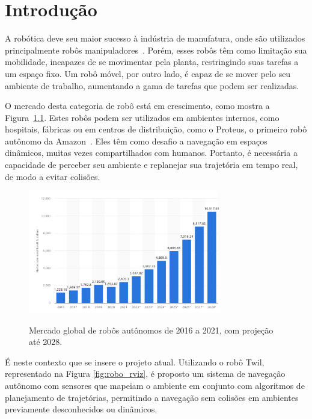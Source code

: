 \documentclass[repeatfields,xlists,xpacks,oneside,yearsonly]{ufrgscca}
\begin{document}
\tableofcontents

\chapter{Introdução}

A robótica deve seu maior sucesso à indústria de manufatura, onde são
utilizados principalmente robôs
manipuladores~\cite{IntroductionToMobileRobots}. Porém, esses robôs
têm como limitação sua mobilidade, incapazes de se movimentar pela
planta, restringindo suas tarefas a um espaço fixo. Um robô móvel,
por outro lado, é capaz de se mover pelo seu ambiente de trabalho,
aumentando a gama de tarefas que podem ser realizadas.

O mercado desta categoria de robô está em crescimento, como mostra a
Figura~\ref{fig:mercado_robo}. Estes robôs podem ser utilizados em
ambientes internos, como hospitais, fábricas ou em centros de
distribuição, como o Proteus, o primeiro robô autônomo da
Amazon~\cite{amazon_robot}. Eles têm como desafio a navegação em
espaços dinâmicos, muitas vezes compartilhados com humanos. Portanto,
é necessária a capacidade de perceber seu ambiente e replanejar sua
trajetória em tempo real, de modo a evitar colisões.


\begin{figure}[htbp]
    {
        \centering
        \caption{Mercado global de robôs autônomos de 2016 a 2021, com projeção até 2028.}
        \label{fig:mercado_robo}
        \includegraphics[width=0.75\textwidth]{mercado_robo}\\
    }
    {}
\end{figure}

É neste contexto que se insere o projeto atual.
Utilizando o robô Twil, representado na Figura \ref{fig:robo_rviz},
é proposto um sistema de navegação autônomo com sensores
que mapeiam o ambiente em conjunto com algoritmos de planejamento
de trajetórias, permitindo a navegação sem colisões em ambientes previamente
desconhecidos ou dinâmicos.
\end{document}
